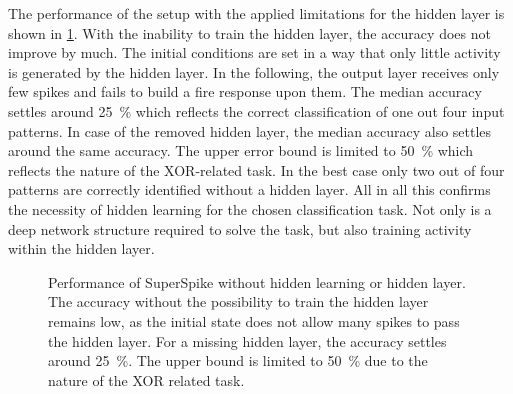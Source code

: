 The performance of the setup with the applied limitations for the hidden layer is shown in \cref{hiddenlearning}. With the inability to train the hidden layer, the accuracy does not improve by much. The initial conditions are set in a way that only little activity is generated by the hidden layer. In the following, the output layer receives only few spikes and fails to build a fire response upon them. The median accuracy settles around \SI{25}{\%} which reflects the correct classification of one out four input patterns. In case of the removed hidden layer, the median accuracy also settles around the same accuracy. The upper error bound is limited to \SI{50}{\%} which reflects the nature of the XOR-related task. In the best case only two out of four patterns are correctly identified without a hidden layer. All in all this confirms the necessity of hidden learning for the chosen classification task. Not only is a deep network structure required to solve the task, but also training activity within the hidden layer.

\begin{figure}[htb!]
		\centering
		
	\caption[Performance of SuperSpike without hidden learning or hidden layer.]{Performance of SuperSpike without hidden learning or hidden layer. The accuracy without the possibility to train the hidden layer remains low, as the initial state does not allow many spikes to pass the hidden layer. For a missing hidden layer, the accuracy settles around \SI{25}{\%}. The upper bound is limited to \SI{50}{\%} due to the nature of the XOR related task.}
	\label{hiddenlearning}
\end{figure}

